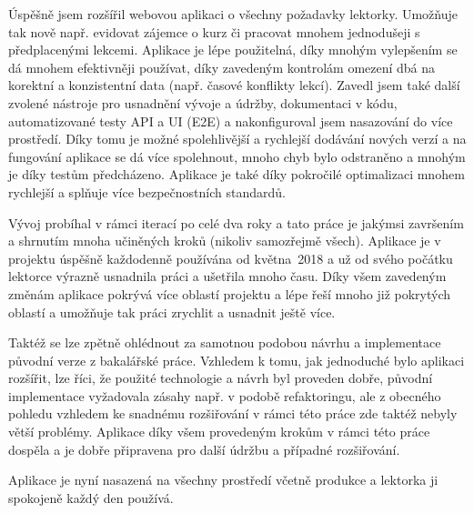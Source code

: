 Úspěšně jsem rozšířil webovou aplikaci o všechny požadavky lektorky. Umožňuje tak nově např. evidovat zájemce o kurz či pracovat mnohem jednodušeji s předplacenými lekcemi. Aplikace je lépe použitelná, díky mnohým vylepšením se dá mnohem efektivněji používat, díky zavedeným kontrolám omezení dbá na korektní a konzistentní data (např. časové konflikty lekcí). Zavedl jsem také další zvolené nástroje pro usnadnění vývoje a údržby, dokumentaci v kódu, automatizované testy API a UI (E2E) a nakonfiguroval jsem nasazování do více prostředí. Díky tomu je možné spolehlivější a rychlejší dodávání nových verzí a na fungování aplikace se dá více spolehnout, mnoho chyb bylo odstraněno a mnohým je díky testům předcházeno. Aplikace je také díky pokročilé optimalizaci mnohem rychlejší a splňuje více bezpečnostních standardů.

Vývoj probíhal v rámci iterací po celé dva roky a tato práce je jakýmsi završením a shrnutím mnoha učiněných kroků (nikoliv samozřejmě všech). Aplikace je v projektu úspěšně každodenně používána od května~2018 a už od svého počátku lektorce výrazně usnadnila práci a ušetřila mnoho času. Díky všem zavedeným změnám aplikace pokrývá více oblastí projektu a lépe řeší mnoho již pokrytých oblastí a umožňuje tak práci zrychlit a usnadnit ještě více.

Taktéž se lze zpětně ohlédnout za samotnou podobou návrhu a implementace původní verze z bakalářské práce. Vzhledem k tomu, jak jednoduché bylo aplikaci rozšířit, lze říci, že použité technologie a návrh byl proveden dobře, původní implementace vyžadovala zásahy např. v podobě refaktoringu, ale z obecného pohledu vzhledem ke snadnému rozšiřování v rámci této práce zde taktéž nebyly větší problémy. Aplikace díky všem provedeným krokům v rámci této práce dospěla a je dobře připravena pro další údržbu a případné rozšiřování.

Aplikace je nyní nasazená na všechny prostředí včetně produkce a lektorka ji spokojeně každý den používá. 
